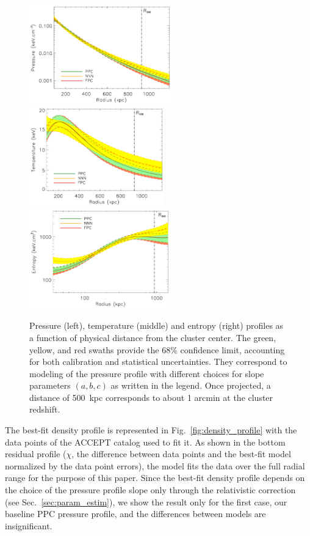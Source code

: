 \documentclass[twocolumn,traditabstract]{aa}
\begin{document}
	\begin{figure}[h]
	\centering
	\includegraphics[height=4.3cm]{Figure/pressure_profile.pdf}
	\includegraphics[height=4.3cm]{Figure/temperature_profile.pdf}
	\includegraphics[height=4.3cm]{Figure/entropy_profile.pdf}
	\caption{Pressure (left), temperature (middle) and entropy (right) profiles as a function of physical distance from the cluster center. The green, yellow, and red swaths provide the 68\% confidence limit, accounting for both calibration and statistical uncertainties. They correspond to modeling of the pressure profile with different choices for slope parameters $\left(a,b,c\right)$ as written in the legend. Once projected, a distance of 500~kpc corresponds to about 1 arcmin at the cluster redshift.}
        \label{fig:thermo_profile}
	\end{figure}

The best-fit density profile is represented in Fig.~\ref{fig:density_profile} with the data points of the ACCEPT catalog used to fit it. As shown in the bottom residual profile ($\chi$, the difference between data points and the best-fit model normalized by the data point errors), the model fits the data over the full radial range for the purpose of this paper. Since the best-fit density profile depends on the choice of the pressure profile slope only through the relativistic correction (see Sec.~\ref{sec:param_estim}), we show the result only for the first case, our baseline PPC pressure profile, and the differences between models are insignificant.
\end{document}
